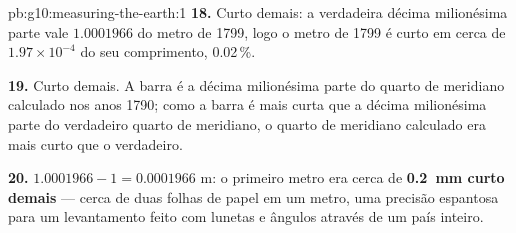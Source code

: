 \begin{solution}{pb:g10:measuring-the-earth:1}
\textbf{18.} Curto demais: a verdadeira décima milionésima parte vale
$1.0001966$ do metro de 1799, logo o metro de 1799 é curto em cerca de
$1.97 \times 10^{-4}$ do seu comprimento, 0.02\,\%.

\textbf{19.} Curto demais. A barra é a décima milionésima parte do quarto de
meridiano calculado nos anos 1790; como a barra é mais curta que a décima
milionésima parte do verdadeiro quarto de meridiano, o quarto de meridiano
calculado era mais curto que o verdadeiro.

\textbf{20.} $1.0001966 - 1 = 0.0001966$ m: o primeiro metro era cerca de
\textbf{\qty{0.2}{mm} curto demais} --- cerca de duas folhas de papel em um
metro, uma precisão espantosa para um levantamento feito com lunetas e
ângulos através de um país inteiro.
\end{solution}
